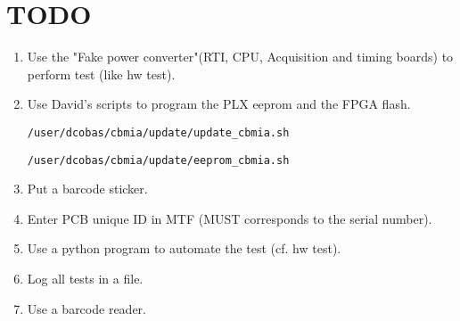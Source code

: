 \documentclass[11pt,a4paper]{article}
\begin{document}
\section{TODO}
\begin{enumerate}
	\item Use the "Fake power converter"(RTI, CPU, Acquisition and timing boards) to perform test (like hw test).
	\item Use David's scripts to program the PLX eeprom and the FPGA flash.
          \begin{verbatim}/user/dcobas/cbmia/update/update_cbmia.sh \end{verbatim}
          \begin{verbatim}/user/dcobas/cbmia/update/eeprom_cbmia.sh \end{verbatim}
        \item Put a barcode sticker.
	\item Enter PCB unique ID in MTF (MUST corresponds to the serial number).
        \item Use a python program to automate the test (cf. hw test).
        \item Log all tests in a file.
        \item Use a barcode reader.
\end{enumerate}
\end{document}
